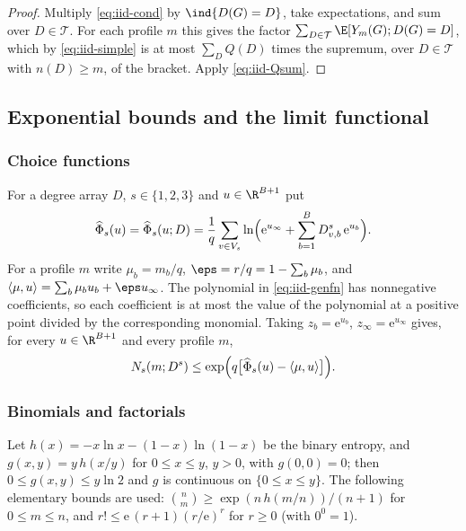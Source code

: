 \begin{proof}
Multiply \eqref{eq:iid-cond} by $\ind\{D(G)=D\}$, take expectations, and sum over
$D\in\mathcal{T}$. For each profile $m$ this gives the factor
$\sum_{D\in\mathcal{T}}\E[Y_m(G);D(G)=D]$, which by \eqref{eq:iid-simple} is at most
$\sum_DQ(D)$ times the supremum, over $D\in\mathcal{T}$ with $n(D)\ge m$, of the bracket.
Apply \eqref{eq:iid-Qsum}.
\end{proof}

\subsection{Exponential bounds and the limit functional}\label{subsec:iid-exponent}

\subsubsection*{Choice functions}
For a degree array $D$, $s\in\{1,2,3\}$ and $u\in\R^{B+1}$ put
\[
\widehat\Phi_s(u)=\widehat\Phi_s(u;D)=\frac1q\sum_{v\in V_s}
\ln\Bigl(\mathrm{e}^{u_\infty}+\sum_{b=1}^BD^s_{v,b}\,\mathrm{e}^{u_b}\Bigr).
\]
For a profile $m$ write $\mu_b=m_b/q$, $\eps=r/q=1-\sum_b\mu_b$, and
$\langle\mu,u\rangle=\sum_b\mu_bu_b+\eps u_\infty$. The polynomial in \eqref{eq:iid-genfn}
has nonnegative coefficients, so each coefficient is at most the value of the polynomial
at a positive point divided by the corresponding monomial. Taking $z_b=\mathrm{e}^{u_b}$,
$z_\infty=\mathrm{e}^{u_\infty}$ gives, for every $u\in\R^{B+1}$ and every profile $m$,
\begin{equation}\label{eq:iid-choice}
N_s(m;D^s)\le\exp\Bigl(q\bigl[\widehat\Phi_s(u)-\langle\mu,u\rangle\bigr]\Bigr).
\end{equation}

\subsubsection*{Binomials and factorials}
Let $h(x)=-x\ln x-(1-x)\ln(1-x)$ be the binary entropy, and $g(x,y)=y\,h(x/y)$ for
$0\le x\le y$, $y>0$, with $g(0,0)=0$; then $0\le g(x,y)\le y\ln2$ and $g$ is continuous on
$\{0\le x\le y\}$. The following elementary bounds are used:
$\binom nm\ge\exp(n\,h(m/n))/(n+1)$ for $0\le m\le n$, and
$r!\le\mathrm{e}\,(r+1)(r/\mathrm{e})^r$ for $r\ge0$ (with $0^0=1$).

